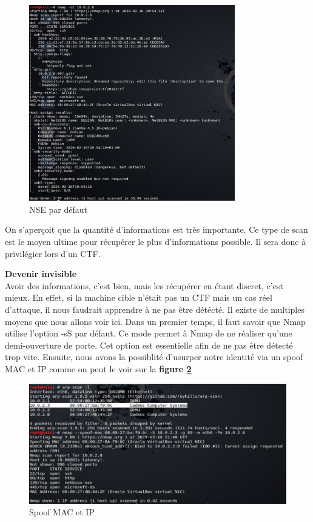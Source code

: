 \begin{figure}[t!]
  \centering
  \setlength\figureheight{7cm}
  \setlength\figurewidth{9cm}
  \includegraphics[width=0.8\textwidth]{oui/images/nmap/scriptscan.PNG}
  \caption{NSE par défaut}
  \label{fig:nse}
\end{figure}

On s'aperçoit que la quantité d'informations est très importante. Ce type de scan est le moyen ultime pour récupérer le plus d'informations possible. Il sera donc à privilégier lors d'un CTF.\\

\newpage

 \textbf{Devenir invisible}\\

Avoir des informations, c'est bien, mais les récupérer en étant discret, c'est mieux. En effet, si la machine cible n'était pas un CTF mais un cas réel d'attaque, il nous faudrait apprendre à ne pas être détécté. Il existe de multiples moyens que nous allons voir ici. Dans un premier temps, il faut savoir que Nmap utilise l'option -sS par défaut. Ce mode permet à Nmap de ne réaliser qu'une demi-ouverture de porte. Cet option est essentielle afin de ne pas être détecté trop vite. Ensuite, nous avons la possiblité d'usurper notre identité via un spoof MAC et IP comme on peut le voir sur la \textbf{figure \ref{fig:spoofip}}\\

\begin{figure}[]
  \centering
  \setlength\figureheight{7cm}
  \setlength\figurewidth{9cm}
  \includegraphics[width=1\textwidth]{oui/images/nmap/spoof.PNG}
  \caption{Spoof MAC et IP}
  \label{fig:spoofip}
\end{figure}

